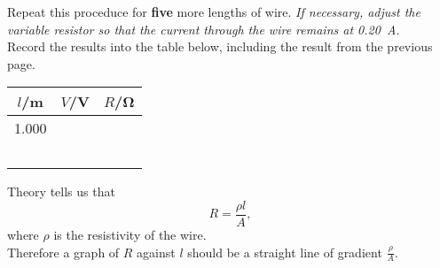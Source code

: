 \begin{questions}

\newpage

\question Repeat this proceduce for {\bf five} more lengths of wire.  \emph{If necessary, adjust the variable resistor so that the current through the wire remains at \SI{0.20}{A}.}\\
Record the results into the table below, including the result from the previous page.

\begin{center}
\begin{tabular}{|p{2.5cm}|p{2.5cm}|p{2.5cm}|}
\hline
\multicolumn{1}{|c|}{$l$/\si{m}} & \multicolumn{1}{|c|}{$V$/\si{V}} & \multicolumn{1}{|c|}{$R$/\si{\ohm}} \\
\hline
1.000 & &\\
\hline
& &\\
\hline
& &\\
\hline
& &\\
\hline
& &\\
\hline
& &\\
\hline
\end{tabular}
\end{center}

\question Theory tells us that
\[R=\frac{\rho l}{A},\]
where $\rho$ is the resistivity of the wire.\\

Therefore a graph of $R$ against $l$ should be a straight line of gradient $\frac{\rho}{A}$.
\end{questions}
